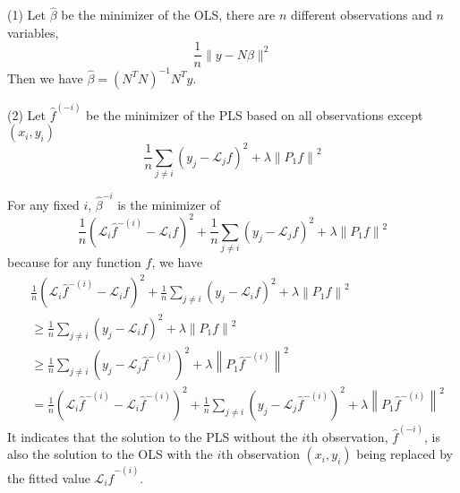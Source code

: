 \begin{solution}
    (1) Let $\hat{\beta}$ be the minimizer of the OLS, there are $n$ different observations and $n$ variables, 
    \begin{equation*}
        \frac{1}{n} \|y - N \beta \|^2
    \end{equation*}
    Then we have $\hat{\beta} =  (N^T N)^{-1} N^T y$.

    (2) Let $\hat{f}^{(-i)}$ be the minimizer of the PLS based on all observations except $(x_i, y_i)$
    \begin{equation*}
        \frac{1}{n} \sum_{j \neq i}\left(y_{j}-\mathcal{L}_{j} f\right)^{2}+\lambda\left\|P_{1} f\right\|^{2}
    \end{equation*}

    For any fixed $i$, $\hat{\beta}^{-i}$ is the minimizer of
    \begin{equation*}
        \frac{1}{n}\left(\mathcal{L}_{i} \hat{f}^{-(i)}-\mathcal{L}_{i} f\right)^{2}+\frac{1}{n} \sum_{j \neq i}\left(y_{j}-\mathcal{L}_{j} f\right)^{2}+\lambda\left\|P_{1} f\right\|^{2}
    \end{equation*}
    because for any function $f$, we have
    \begin{equation*}
    \begin{split} 
        & \frac{1}{n}\left(\mathcal{L}_{i} \hat{f}^{-(i)}-\mathcal{L}_{i} f\right)^{2}+\frac{1}{n} \sum_{j \neq i}\left(y_{j}-\mathcal{L}_{i} f\right)^{2}+\lambda\left\|P_{1} f\right\|^{2} \\ 
        & \geq \frac{1}{n} \sum_{j \neq i}\left(y_{j}-\mathcal{L}_{i} f\right)^{2}+\lambda\left\|P_{1} f\right\|^{2} \\ 
        & \geq \frac{1}{n} \sum_{j \neq i}\left(y_{j}-\mathcal{L}_{j} \hat{f}^{-(i)}\right)^{2}+\lambda\left\|P_{1} \hat{f}^{-(i)}\right\|^{2} \\
        & = \frac{1}{n}\left(\mathcal{L}_{i} \hat{f}^{-(i)}-\mathcal{L}_{i} \hat{f}^{-(i)}\right)^{2}+\frac{1}{n} \sum_{j \neq i}\left(y_{j}-\mathcal{L}_{j} \hat{f}^{-(i)}\right)^{2}+\lambda\left\|P_{1} \hat{f}^{-(i)}\right\|^{2} 
    \end{split}
    \end{equation*}
    It indicates that the solution to the PLS without the $i$th observation, $\hat{f}^{(-i)}$, is also the solution to the OLS with the $i$th observation $(x_i, y_i)$ being replaced by the fitted value $\mathcal{L}_{i} \hat{f}^{-(i)}$. 


\end{solution}
